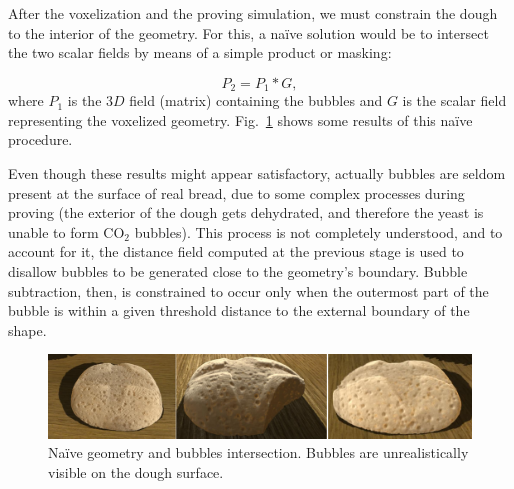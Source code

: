 After the voxelization and the proving simulation, we must constrain the dough to the interior of the geometry. 
For this, a na\"ive solution would be to intersect the two scalar fields by means of a simple product or masking:

\begin{equation*}
P_{2} = P_{1} * G,
\end{equation*}
%
where $P_{1}$ is the $3D$ field (matrix) containing the bubbles and $G$ is the scalar field representing the voxelized geometry. 
Fig.~\ref{fg:intersectProblem} shows some results of this na\"ive procedure.

Even though these results might appear satisfactory, actually bubbles are seldom present at the surface of real bread, due to some complex processes during proving (the exterior of the dough gets dehydrated, and therefore the yeast is unable to form CO$_2$ bubbles).
This process is not completely understood, and to account for it, the distance field computed at the previous stage is used to disallow bubbles to be generated close to the geometry's boundary. 
Bubble subtraction, then, is constrained to occur only when the outermost part of the bubble is within a given threshold distance to the external boundary of the shape.

\begin{figure}
\includegraphics[width=13cm]{figures/intersectProblem}
\caption{Na\"ive geometry and bubbles intersection. Bubbles are unrealistically visible on the dough surface.}
\label{fg:intersectProblem}
\end{figure}

%

